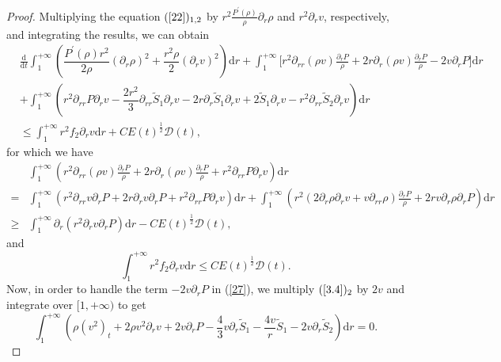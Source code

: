 \documentclass[10pt,reqno]{amsart}
\numberwithin{equation}{section}
\begin{document}
\begin{proof}
		Multiplying the equation $(\ref{22})_{1,2}$ by $r^2 \frac{P^{\prime}(\rho)}{\rho} \partial_r \rho$ and $r^2 \partial_{r}v$, respectively,  and integrating the results, we can obtain
		\begin{equation}\label{27}
			\begin{aligned}
				&\frac{\mathrm{d}}{\mathrm{d} t}\int_{1}^{+\infty}(\dfrac{P^{\prime}(\rho)r^2}{2\rho}\left(\partial_r \rho\right)^2+\dfrac{r^2\rho}{2} (\partial_{r}v)^2) \mathrm{d}r
				+\int_{1}^{+\infty}\big[
				r^2\partial_{rr}\left(\rho v\right)\frac{ \partial_r P}{\rho}
				+2r\partial_{r}\left(\rho v\right)\frac{ \partial_r P}{\rho}-2v\partial_{r}P\big]\mathrm{d}r\\
				&+\int_{1}^{+\infty}\left(r^2 \partial_{rr}P \partial_{r}v-\dfrac{2 r^2}{3} \partial_{rr}\tilde{S}_1 \partial_{r}v-2r \partial_{r}\tilde{S}_1 \partial_{r}v+2\tilde{S}_1\partial_{r}v-r^2 \partial_{rr}\tilde{S}_2\partial_{r}v\right)\mathrm{d}r\\
				&\le\int_{1}^{+\infty}r^2f_2 \partial_{r}v\mathrm{d}r+ C E(t)^{\frac{1}{2}}\mathcal{D}(t),
			\end{aligned}
		\end{equation}
		for which we have 
		\begin{equation}\nonumber
			\begin{aligned}
				&\int_{1}^{+\infty}(r^2  \partial_{rr}(\rho v)  \frac{\partial_r P}{\rho}
				+2 r \partial_r(\rho v)  \frac{\partial_r P}{\rho}
				+r^2 \partial_{rr}P \partial_r v)\mathrm{d}r\\
				=&\int_{1}^{+\infty} (r^2\partial_{rr} v\partial_r P+2r\partial_{r} v\partial_r P+r^2\partial_{rr} P\partial_r v)	\mathrm{d}r
				+\int_{1}^{+\infty}(r^2(2\partial_r\rho\partial_rv
				+v\partial_{rr}\rho)\frac{\partial_r P}{\rho}+2r v \partial_r \rho\partial_r P)\mathrm{d}r\\
				\geq&\int_{1}^{+\infty} \partial_{r}(r^2\partial_{r} v  \partial_r P)\mathrm{d}r
				-C E(t)^{\frac{1}{2}}\mathcal{D}(t),
			\end{aligned}
		\end{equation}
		and
		\begin{equation}\nonumber
			\int_{1}^{+\infty}r^2f_2 \partial_{r}v\mathrm{d}r\leq C E(t)^{\frac{1}{2}}\mathcal{D}(t).
		\end{equation}
		Now, in order to handle the term $-2v\partial_{r}P$ in (\ref{27}), we multiply $(\ref{3.4})_2$ by $2v$ and integrate over $[1,+\infty)$ to get
		\begin{equation}\label{3.29}
			\int_{1}^{+\infty}\left(\rho (v^2)_t+2\rho v^2\partial_{r}v+2v\partial_{r}P-\dfrac{4}{3}v\partial_r \tilde{S}_1-\dfrac{4 v }{r}\tilde{S}_1-2v\partial_{r}\tilde{S}_2\right)\mathrm{d}r=0.
		\end{equation}
		

\end{proof}
\end{document}
